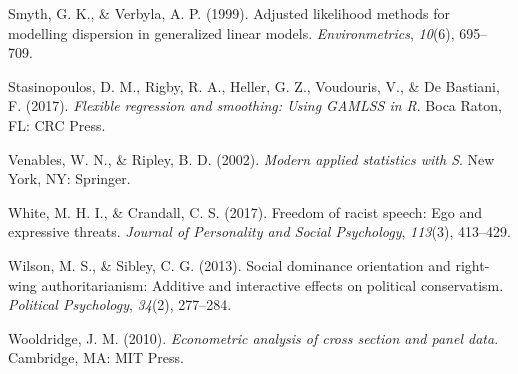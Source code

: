 \documentclass[english,man]{apa6}
\newcounter{author}
\theoremstyle{definition}
\theoremstyle{definition}
\theoremstyle{remark}
\begin{document}
\hypertarget{ref-smyth1999adjusted}{}
Smyth, G. K., \& Verbyla, A. P. (1999). Adjusted likelihood methods for
modelling dispersion in generalized linear models.
\emph{Environmetrics}, \emph{10}(6), 695--709.

\hypertarget{ref-stasinopoulos2017flexible}{}
Stasinopoulos, D. M., Rigby, R. A., Heller, G. Z., Voudouris, V., \& De
Bastiani, F. (2017). \emph{Flexible regression and smoothing: Using
GAMLSS in R}. Boca Raton, FL: CRC Press.

\hypertarget{ref-venables2002modern}{}
Venables, W. N., \& Ripley, B. D. (2002). \emph{Modern applied
statistics with S}. New York, NY: Springer.

\hypertarget{ref-white2017freedom}{}
White, M. H. I., \& Crandall, C. S. (2017). Freedom of racist speech:
Ego and expressive threats. \emph{Journal of Personality and Social
Psychology}, \emph{113}(3), 413--429.

\hypertarget{ref-wilson2013social}{}
Wilson, M. S., \& Sibley, C. G. (2013). Social dominance orientation and
right-wing authoritarianism: Additive and interactive effects on
political conservatism. \emph{Political Psychology}, \emph{34}(2),
277--284.

\hypertarget{ref-wooldridge2010econometric}{}
Wooldridge, J. M. (2010). \emph{Econometric analysis of cross section
and panel data}. Cambridge, MA: MIT Press.
\end{document}

